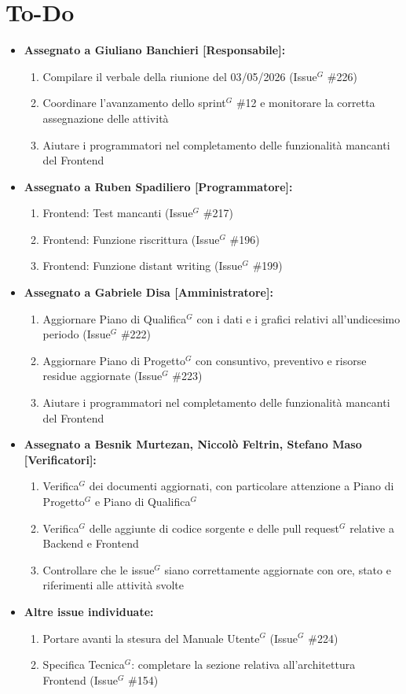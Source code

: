 \documentclass[a4paper,10pt]{article}
\begin{document}
\section*{To-Do}
\begin{itemize}
\item \textbf{Assegnato a Giuliano Banchieri [Responsabile]:}
    \begin{enumerate}
    \item Compilare il verbale della riunione del 03/05/2026 (Issue$^G$ \#226)
    \item Coordinare l'avanzamento dello sprint$^G$ \#12 e monitorare la corretta assegnazione delle attività
    \item Aiutare i programmatori nel completamento delle funzionalità mancanti del Frontend
    \end{enumerate}

\item \textbf{Assegnato a Ruben Spadiliero [Programmatore]:}
    \begin{enumerate}
        \item Frontend: Test mancanti (Issue$^G$ \#217)
        \item Frontend: Funzione riscrittura (Issue$^G$ \#196)
        \item Frontend: Funzione distant writing (Issue$^G$ \#199)
  \end{enumerate}

\item \textbf{Assegnato a Gabriele Disa [Amministratore]:}
    \begin{enumerate}
    \item Aggiornare Piano di Qualifica$^G$ con i dati e i grafici relativi all'undicesimo periodo (Issue$^G$ \#222)
    \item Aggiornare Piano di Progetto$^G$ con consuntivo, preventivo e risorse residue aggiornate (Issue$^G$ \#223)
    \item Aiutare i programmatori nel completamento delle funzionalità mancanti del Frontend
    \end{enumerate}

\item \textbf{Assegnato a Besnik Murtezan, Niccolò Feltrin, Stefano Maso [Verificatori]:}
    \begin{enumerate}
    \item Verifica$^G$ dei documenti aggiornati, con particolare attenzione a Piano di Progetto$^G$ e Piano di Qualifica$^G$
    \item Verifica$^G$ delle aggiunte di codice sorgente e delle pull request$^G$ relative a Backend e Frontend
    \item Controllare che le issue$^G$ siano correttamente aggiornate con ore, stato e riferimenti alle attività svolte
    \end{enumerate}

\item \textbf{Altre issue individuate:}
    \begin{enumerate}
    \item Portare avanti la stesura del Manuale Utente$^G$ (Issue$^G$ \#224)
    \item Specifica Tecnica$^G$: completare la sezione relativa all'architettura Frontend (Issue$^G$ \#154)
    \end{enumerate}
\end{itemize}
\end{document}
